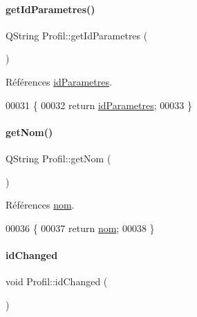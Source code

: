 \paragraph{\texorpdfstring{get\+Id\+Parametres()}{getIdParametres()}}
{\footnotesize\ttfamily Q\+String Profil\+::get\+Id\+Parametres (\begin{DoxyParamCaption}{ }\end{DoxyParamCaption})}



Références \hyperlink{class_profil_a2cdcb0b7614e783ba20ae93eaefebd0c}{id\+Parametres}.


\begin{DoxyCode}
00031 \{
00032     \textcolor{keywordflow}{return} \hyperlink{class_profil_a2cdcb0b7614e783ba20ae93eaefebd0c}{idParametres};
00033 \}
\end{DoxyCode}
\mbox{\label{class_profil_a14d2e1976d9e4f5eecfea9347a7647b0}} 
\paragraph{\texorpdfstring{get\+Nom()}{getNom()}}
{\footnotesize\ttfamily Q\+String Profil\+::get\+Nom (\begin{DoxyParamCaption}{ }\end{DoxyParamCaption})}



Références \hyperlink{class_profil_a919585bdd5c7e7382e6a25c5152d0ca3}{nom}.


\begin{DoxyCode}
00036 \{
00037     \textcolor{keywordflow}{return} \hyperlink{class_profil_a919585bdd5c7e7382e6a25c5152d0ca3}{nom};
00038 \}
\end{DoxyCode}
\mbox{\label{class_profil_a0d67f046b27cfa936590d72a3fef82aa}} 
\paragraph{\texorpdfstring{id\+Changed}{idChanged}}
{\footnotesize\ttfamily void Profil\+::id\+Changed (\begin{DoxyParamCaption}{ }\end{DoxyParamCaption})\hspace{0.3cm}{\ttfamily [signal]}}

